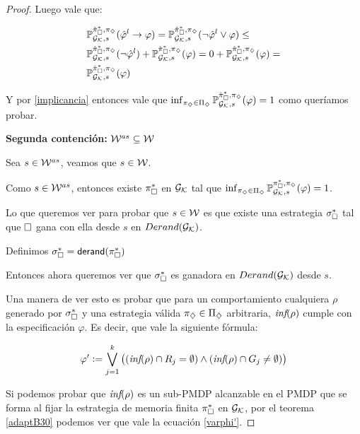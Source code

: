 \begin{proof}
	Luego vale que:

	\begin{align*}
		&\mathbb{P}_{\mathcal{G}_{\mathcal{K}},s}^{\hat{\pi}_{\square}^{*}, \pi_\diamondsuit}(\hat{\varphi}^l \rightarrow \varphi) = \mathbb{P}_{\mathcal{G}_{\mathcal{K}},s}^{\hat{\pi}_{\square}^{*}, \pi_\diamondsuit}(\neg \hat{\varphi}^l \vee \varphi) \leq \\
		&\mathbb{P}_{\mathcal{G}_{\mathcal{K}},s}^{\hat{\pi}_{\square}^{*}, \pi_\diamondsuit}(\neg \hat{\varphi}^l) + \mathbb{P}_{\mathcal{G}_{\mathcal{K}},s}^{\hat{\pi}_{\square}^{*}, \pi_\diamondsuit}(\varphi) = 0 + \mathbb{P}_{\mathcal{G}_{\mathcal{K}},s}^{\hat{\pi}_{\square}^{*}, \pi_\diamondsuit}(\varphi) = \\
		&\mathbb{P}_{\mathcal{G}_{\mathcal{K}},s}^{\hat{\pi}_{\square}^{*}, \pi_\diamondsuit}(\varphi)
	\end{align*}

	Y por \ref{implicancia} entonces vale que $\inf_{\pi_\diamondsuit \in \Pi_\diamondsuit}
		\mathbb{P}_{\mathcal{G}_{\mathcal{K}},s}^{\hat{\pi}_{\square}^{*}, \pi_\diamondsuit}(\varphi) = 1$ como queríamos probar.


	\textbf{Segunda contención: } $\mathcal{W}^{as} \subseteq \mathcal{W}$

	Sea $s \in \mathcal{W}^{as}$, veamos que $s \in \mathcal{W}$.

	Como $s \in \mathcal{W}^{as}$, entonces existe $\pi_\square^*$ en $\mathcal{G}_{\mathcal{K}}$ tal que
	$\inf_{\pi_\diamondsuit \in \Pi_\diamondsuit}\mathbb{P}_{\mathcal{G}_{\mathcal{K}},s}^{\pi_\square^*, \pi_\diamondsuit}(\varphi) = 1$.

	Lo que queremos ver para probar que $s \in \mathcal{W}$ es que existe una estrategia
	$\sigma_\square^*$ tal que $\square$ gana con ella desde $s$ en $Derand(\mathcal{G}_{\mathcal{K}})$.

	Definimos $\sigma_\square^* = \textsf{derand}(\pi_\square^*)$

	Entonces ahora queremos ver que $\sigma_\square^*$ es ganadora en $Derand(\mathcal{G}_{\mathcal{K}})$ desde
	$s$.

	Una manera de ver esto es probar que para un comportamiento cualquiera $\rho$
	generado por $\sigma_\square^*$ y una estrategia válida $\pi_\diamondsuit \in \Pi_\diamondsuit$
	arbitraria, $\textit{inf}(\rho)$ cumple con la especificación $\varphi$. Es decir, que
	vale la siguiente fórmula:


	\begin{equation}
		\label{varphi'}
		\varphi' := \bigvee_{j = 1}^{k} \left((\textit{inf}(\rho) \cap R_j = \emptyset) \wedge (\textit{inf}(\rho) \cap G_j \neq \emptyset)  \right)
	\end{equation}

	Si podemos probar que $\textit{inf}(\rho)$ es un sub-PMDP alcanzable en el PMDP que se
	forma al fijar la estrategia de memoria finita $\pi_\square^*$ en $\mathcal{G}_{\mathcal{K}}$, por el
	teorema \ref{adaptB30} podemos ver que vale la ecuación \ref{varphi'}.


\end{proof}
